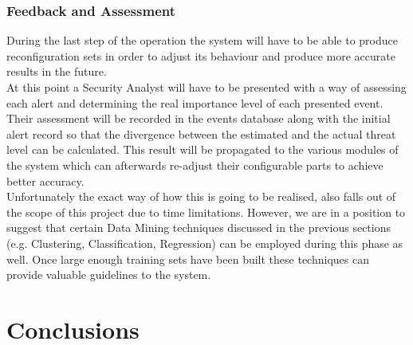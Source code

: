 \documentclass[12pt]{article}
\begin{document}
\subsubsection{Feedback and Assessment}
During the last step of the operation the system will have to be able to produce reconfiguration sets in order to adjust its behaviour and produce more accurate results in the future.
\hfill \break\\
At this point a Security Analyst will have to be presented with a way of assessing each alert and  determining the real importance level of each presented event.
\hfill \break\\
Their assessment will be recorded in the events database along with the initial alert record so that the divergence between the estimated and the actual threat level can be calculated. This result will be propagated to the various modules of the system which can afterwards re-adjust their configurable parts to achieve better accuracy.
\hfill \break\\
Unfortunately the exact way of how this is going to be realised, also falls out of the scope of this project due to time limitations. However, we are in a position to suggest that certain Data Mining techniques discussed in the previous sections (e.g. Clustering, Classification, Regression) can be employed during this phase as well. Once large enough training sets have been built these techniques can provide valuable guidelines to the system. 

\newpage
\section{Conclusions}
\end{document}
